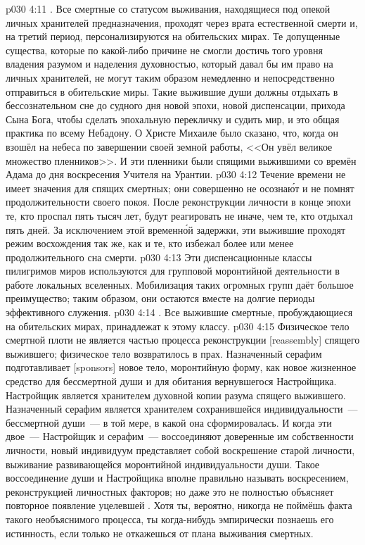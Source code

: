 \vs p030 4:11 . Все смертные со статусом выживания, находящиеся под опекой личных хранителей предназначения, проходят через врата естественной смерти и, на третий период, персонализируются на обительских мирах. Те допущенные существа, которые по какой\hyp{}либо причине не смогли достичь того уровня владения разумом и наделения духовностью, который давал бы им право на личных хранителей, не могут таким образом немедленно и непосредственно отправиться в обительские миры. Такие выжившие души должны отдыхать в бессознательном сне до судного дня новой эпохи, новой диспенсации, прихода Сына Бога, чтобы сделать эпохальную перекличку и судить мир, и это общая практика по всему Небадону. О Христе Михаиле было сказано, что, когда он взошёл на небеса по завершении своей земной работы, <<Он увёл великое множество пленников>>. И эти пленники были спящими выжившими со времён Адама до дня воскресения Учителя на Урантии.
\vs p030 4:12 Течение времени не имеет значения для спящих смертных; они совершенно не осозна\'ют и не помнят продолжительности своего покоя. После реконструкции личности в конце эпохи те, кто проспал пять тысяч лет, будут реагировать не иначе, чем те, кто отдыхал пять дней. За исключением этой временн\'ой задержки, эти выжившие проходят режим восхождения так же, как и те, кто избежал более или менее продолжительного сна смерти.
\vs p030 4:13 Эти диспенсационные классы пилигримов миров используются для групповой моронтийной деятельности в работе локальных вселенных. Мобилизация таких огромных групп даёт большое преимущество; таким образом, они остаются вместе на долгие периоды эффективного служения.
\vs p030 4:14 . Все выжившие смертные, пробуждающиеся на обительских мирах, принадлежат к этому классу.
\vs p030 4:15 Физическое тело смертной плоти не является частью процесса реконструкции [reassembly] спящего выжившего; физическое тело возвратилось в прах. Назначенный серафим подготавливает [sponsors] новое тело, моронтийную форму, как новое жизненное средство для бессмертной души и для обитания вернувшегося Настройщика. Настройщик является хранителем духовной копии разума спящего выжившего. Назначенный серафим является хранителем сохранившейся индивидуальности~--- бессмертной души~--- в той мере, в какой она сформировалась. И когда эти двое~--- Настройщик и серафим~--- воссоединяют доверенные им собственности личности, новый индивидуум представляет собой воскрешение старой личности, выживание развивающейся моронтийной индивидуальности души. Такое воссоединение души и Настройщика вполне правильно называть воскресением, реконструкцией личностных факторов; но даже это не полностью объясняет повторное появление уцелевшей . Хотя ты, вероятно, никогда не поймёшь факта такого необъяснимого процесса, ты когда\hyp{}нибудь эмпирически познаешь его истинность, если только не откажешься от плана выживания смертных.
